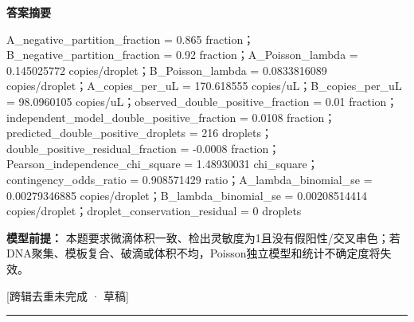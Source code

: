 \documentclass[UTF8,11pt,a4paper]{ctexart}
\begin{document}
\noindent\textbf{答案摘要}\par
A\_negative\_partition\_fraction = 0.865 fraction；B\_negative\_partition\_fraction = 0.92 fraction；A\_Poisson\_lambda = 0.145025772 copies/droplet；B\_Poisson\_lambda = 0.0833816089 copies/droplet；A\_copies\_per\_uL = 170.618555 copies/uL；B\_copies\_per\_uL = 98.0960105 copies/uL；observed\_double\_positive\_fraction = 0.01 fraction；independent\_model\_double\_positive\_fraction = 0.0108 fraction；predicted\_double\_positive\_droplets = 216 droplets；double\_positive\_residual\_fraction = -0.0008 fraction；Pearson\_independence\_chi\_square = 1.48930031 chi\_square；contingency\_odds\_ratio = 0.908571429 ratio；A\_lambda\_binomial\_se = 0.00279346885 copies/droplet；B\_lambda\_binomial\_se = 0.00208514414 copies/droplet；droplet\_conservation\_residual = 0 droplets\par
\noindent\textbf{模型前提：}
本题要求微滴体积一致、检出灵敏度为1且没有假阳性/交叉串色；若DNA聚集、模板复合、破滴或体积不均，Poisson独立模型和统计不确定度将失效。\par
\noindent\textcolor{red!65!black}{[跨辑去重未完成 · 草稿]} \par
\medskip\hrule\medskip
{}
\end{document}
